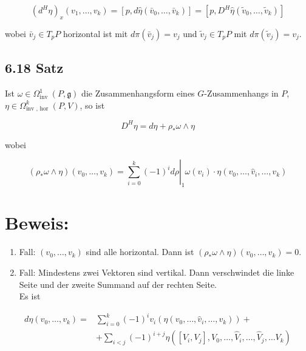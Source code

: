 $$
\left(d^{H} \eta\right)_{x}\left(v_{1}, \ldots, v_{k}\right)=\left[p, d \hat{\eta}\left(\bar{v}_{0}, \ldots, \bar{v}_{k}\right)\right]=\left[p, D^{H} \hat{\eta}\left(\tilde{v}_{0}, \ldots, \tilde{v}_{k}\right)\right]
$$

wobei $\bar{v}_{j} \in T_{p} P$ horizontal ist mit $d \pi\left(\bar{v}_{j}\right)=v_{j}$ und $\tilde{v}_{j} \in T_{p} P$ mit $d \pi\left(\tilde{v}_{j}\right)=v_{j}$.

\subsection*{6.18 Satz}
Ist $\omega \in \Omega_{\text {inv }}^{1}(P, \mathfrak{g})$ die Zusammenhangsform eines $G$-Zusammenhangs in $P$, $\eta \in \Omega_{\text {inv }, \text { hor }}^{k}(P, V)$, so ist

$$
D^{H} \eta=d \eta+\rho_{*} \omega \wedge \eta
$$

wobei

$$
\left(\rho_{*} \omega \wedge \eta\right)\left(v_{0}, \ldots, v_{k}\right)=\left.\sum_{i=0}^{k}(-1)^{i} d \rho\right|_{1} \omega\left(v_{i}\right) \cdot \eta\left(v_{0}, \ldots, \hat{v}_{i}, \ldots, v_{k}\right)
$$

\section*{Beweis:}
\begin{enumerate}
  \item Fall: $\left(v_{0}, \ldots, v_{k}\right)$ sind alle horizontal. Dann ist $\left(\rho_{*} \omega \wedge \eta\right)\left(v_{0}, \ldots, v_{k}\right)=0$.
  \item Fall: Mindestens zwei Vektoren sind vertikal. Dann verschwindet die linke Seite und der zweite Summand auf der rechten Seite.\\
Es ist
\end{enumerate}

$$
\begin{aligned}
d \eta\left(v_{0}, \ldots, v_{k}\right)= & \sum_{i=0}^{k}(-1)^{i} v_{i}\left(\eta\left(v_{0}, \ldots, \hat{v}_{i}, \ldots, v_{k}\right)\right)+ \\
& +\sum_{i<j}(-1)^{i+j} \eta\left(\left[V_{i}, V_{j}\right], V_{0}, \ldots, \hat{V}_{i}, \ldots, \hat{V}_{j}, \ldots V_{k}\right)
\end{aligned}
$$

